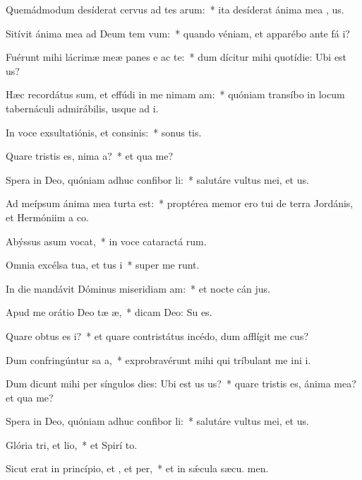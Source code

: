 \item Quemádmodum desíderat cervus ad tes arum:~* ita desíderat ánima mea  , us.
\item Sitívit ánima mea ad Deum tem vum:~* quando véniam, et apparébo ante fá i?
\item Fuérunt mihi lácrimæ meæ panes e ac te:~* dum dícitur mihi quotídie: Ubi est  us?
\item Hæc recordátus sum, et effúdi in me nimam am:~* quóniam transíbo in locum tabernáculi admirábilis, usque ad  i.
\item In voce exsultatiónis, et consinis:~* sonus tis.
\item Quare tristis es, nima a?~* et qua  me?
\item Spera in Deo, quóniam adhuc confibor li:~* salutáre vultus mei, et  us.
\item Ad meípsum ánima mea turta est:~* proptérea memor ero tui de terra Jordánis, et Hermóniim a  co.
\item Abýssus asum vocat,~* in voce cataractá rum.
\item Omnia excélsa tua, et tus i~* super me runt.
\item In die mandávit Dóminus miseridiam am:~* et nocte cán jus.
\item Apud me orátio Deo tæ æ,~* dicam Deo: Su  es.
\item Quare obtus es i?~* et quare contristátus incédo, dum afflígit me cus?
\item Dum confringúntur sa a,~* exprobravérunt mihi qui tríbulant me ini i.
\item Dum dicunt mihi per síngulos dies: Ubi est us us?~* quare tristis es, ánima mea? et qua  me?
\item Spera in Deo, quóniam adhuc confibor li:~* salutáre vultus mei, et  us.
\item Glória tri, et lio,~* et Spirí to.
\item Sicut erat in princípio, et , et per,~* et in sǽcula sæcu. men.

